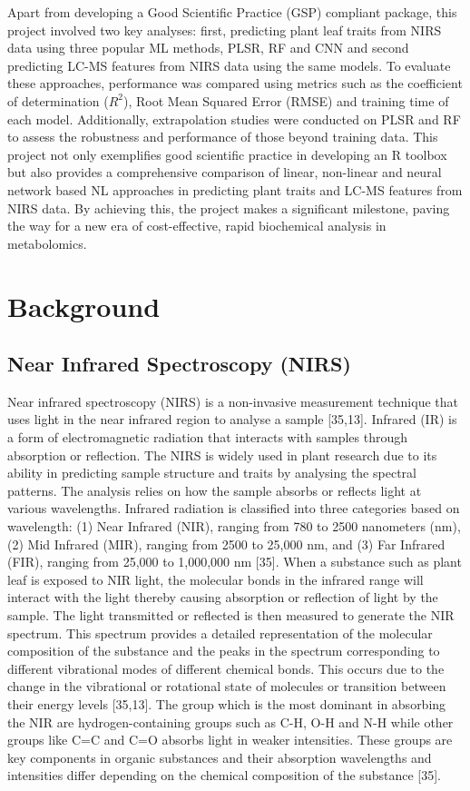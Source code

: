 \documentclass[12pt,a4paper]{article}
\begin{document}
Apart from developing a Good Scientific Practice (GSP) compliant package, this project involved two key analyses: first, predicting plant leaf traits from NIRS data using three popular ML methods, PLSR, RF and CNN and second predicting LC-MS features from NIRS data using the same models. To evaluate these approaches, performance was compared using metrics such as the coefficient of determination ($R^2$), Root Mean Squared Error (RMSE) and training time of each model. Additionally,
extrapolation studies were conducted on PLSR and RF to assess the robustness and performance of those beyond training data. This project not only exemplifies good scientific practice in developing an R toolbox but also provides a comprehensive comparison of linear, non-linear and neural network based NL approaches in predicting plant traits and LC-MS features from NIRS data. By achieving this, the project makes a significant milestone, paving the way for a new era of cost-effective, rapid biochemical analysis in metabolomics. \\



\chapter{Background}

\section{Near Infrared Spectroscopy (NIRS)}
Near infrared spectroscopy (NIRS) is a non-invasive measurement technique that uses light in the near infrared region to analyse a sample [35,13]. Infrared (IR) is a form of electromagnetic radiation that interacts with samples through absorption or reflection. The NIRS is widely used in plant research due to its ability in predicting sample structure and traits by analysing the spectral patterns. The analysis relies on how the sample absorbs or reflects light at various wavelengths. 
Infrared radiation is classified into three categories based on wavelength: (1) Near Infrared (NIR), ranging from 780 to 2500 nanometers (nm), (2) Mid Infrared (MIR), ranging from 2500 to 25,000 nm, and (3) Far Infrared (FIR), ranging from 25,000 to 1,000,000 nm [35]. When a substance such as plant leaf is exposed to NIR light, the molecular bonds in the infrared range will interact with the light thereby causing absorption or reflection of light by the sample. The light transmitted 
or reflected is then measured to generate the NIR spectrum. This spectrum provides a detailed representation of the molecular composition of the substance and the peaks in the spectrum corresponding to different vibrational modes of different chemical bonds. This occurs due to the change in the vibrational or rotational state of molecules or transition between their energy levels [35,13]. The group which is the most dominant in absorbing the NIR are hydrogen-containing groups such as 
C-H, O-H and N-H while other groups like C=C and C=O absorbs light in weaker intensities. These groups are key components in organic substances and their absorption wavelengths and intensities differ depending on the chemical composition of the substance [35]. \\ 
\end{document}
